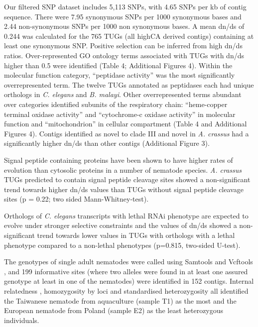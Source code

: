\documentclass[10pt]{bmc_article}
\newenvironment{bmcformat}{\begin{raggedright}\baselineskip20pt\sloppy\setboolean{publ}{false}}{\end{raggedright}\baselineskip20pt\sloppy}
\begin{document}
\begin{bmcformat}
Our filtered SNP dataset includes 5,113 SNPs, with 4.65 SNPs per kb of
contig sequence. There were 7.95 synonymous SNPs per 1000 synonymous
bases and 2.44 non-synonymous SNPs per 1000 non synonymous bases. A
mean dn/ds of 0.244 was calculated for the 765 TUGs (all highCA
derived contigs) containing at least one synonymous SNP. Positive
selection can be inferred from high dn/ds ratios. Over-represented GO
ontology terms associated with TUGs with dn/ds higher than 0.5 were
identified (Table 4; Additional Figures 4). Within the molecular
function category, ``peptidase activity'' was the most significantly
overrepresented term. The twelve TUGs annotated as peptidases each had
unique orthologs in \textit{C. elegans} and \textit{B. malayi}. Other
overrepresented terms abundant over categories identified subunits of
the respiratory chain: ``heme-copper terminal oxidase activity'' and
``cytochrome-c oxidase activity'' in molecular function and
``mitochondrion'' in cellular compartment (Table 4 and Additional
Figures 4). Contigs identified as novel to clade III and novel in
\textit{A. crassus} had a significantly higher dn/ds than other
contigs (Additional Figure 3).

Signal peptide containing proteins have been shown to have higher
rates of evolution than cytosolic proteins in a number of nematode
species. \textit{A. crassus} TUGs predicted to contain signal peptide
cleavage sites showed a non-significant trend towards higher dn/ds
values than TUGs without signal peptide cleavage sites (p =
0.22; two sided Mann-Whitney-test).

Orthologs of \textit{C. elegans} transcripts with lethal RNAi
phenotype are expected to evolve under stronger selective constraints
and the values of dn/ds showed a non-significant trend towards lower
values in TUGs with orthologs with a lethal phenotype compared to a
non-lethal phenotypes (p=0.815, two-sided
U-test).

The genotypes of single adult nematodes were called using Samtools
\cite{journals/bioinformatics/LiHWFRHMAD09} and Vcftools
\cite{pmid21653522}, and 199 informative sites (where
two alleles were found in at least one assured genotype at least in
one of the nematodes) were identified in 152
contigs. Internal relatedness \cite{pmid11571049}, homozygosity by
loci \cite{pmid17107491} and standardised heterozygosity
\cite{coltman81j} all identified the Taiwanese nematode from
aquaculture (sample T1) as the most and the European nematode from
Poland (sample E2) as the least heterozygous individuals.


\end{bmcformat}
\end{document}
